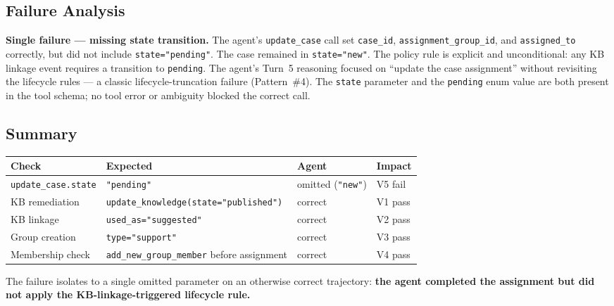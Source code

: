 \subsection{Failure Analysis}
\label{failure-analysis}

\textbf{Single failure --- missing state transition.} The agent's
\texttt{update\_case} call set \texttt{case\_id},
\texttt{assignment\_group\_id}, and \texttt{assigned\_to} correctly, but
did not include \texttt{state="pending"}. The case remained in
\texttt{state="new"}. The policy rule is explicit and unconditional: any
KB linkage event requires a transition to \texttt{pending}. The agent's
Turn~5 reasoning focused on ``update the case assignment'' without
revisiting the lifecycle rules --- a classic lifecycle-truncation failure
(Pattern~\#4). The \texttt{state} parameter and the \texttt{pending} enum
value are both present in the tool schema; no tool error or ambiguity
blocked the correct call.

\subsection{Summary}
\label{summary}

\begin{center}
\begin{tabular}{llll}
\toprule
\textbf{Check}           & \textbf{Expected}                         & \textbf{Agent}               & \textbf{Impact} \\
\midrule
\texttt{update\_case.state}   & \texttt{"pending"}               & omitted (\texttt{"new"})     & V5 fail \\
KB remediation                & \texttt{update\_knowledge(state="published")} & correct             & V1 pass \\
KB linkage                    & \texttt{used\_as="suggested"}    & correct                      & V2 pass \\
Group creation                & \texttt{type="support"}          & correct                      & V3 pass \\
Membership check              & \texttt{add\_new\_group\_member} before assignment & correct    & V4 pass \\
\bottomrule
\end{tabular}
\end{center}

\medskip

The failure isolates to a single omitted parameter on an otherwise
correct trajectory: \textbf{the agent completed the assignment but did
not apply the KB-linkage-triggered lifecycle rule.}
